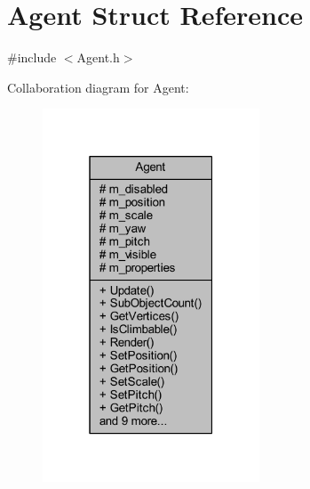 \hypertarget{struct_agent}{}\section{Agent Struct Reference}
\label{struct_agent}


{\ttfamily \#include $<$Agent.\+h$>$}



Collaboration diagram for Agent\+:\nopagebreak
\begin{figure}[H]
\begin{center}
\leavevmode
\includegraphics[width=183pt]{struct_agent__coll__graph}
\end{center}
\end{figure}
